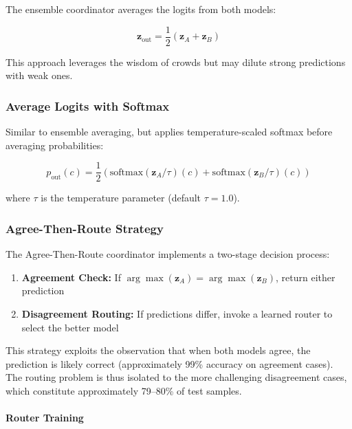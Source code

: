 The ensemble coordinator averages the logits from both models:

\begin{equation}
\mathbf{z}_{\text{out}} = \frac{1}{2}(\mathbf{z}_A + \mathbf{z}_B)
\end{equation}

This approach leverages the wisdom of crowds but may dilute strong predictions with weak ones.

\subsubsection{Average Logits with Softmax}

Similar to ensemble averaging, but applies temperature-scaled softmax before averaging probabilities:

\begin{equation}
p_{\text{out}}(c) = \frac{1}{2}\left(\text{softmax}(\mathbf{z}_A / \tau)(c) + \text{softmax}(\mathbf{z}_B / \tau)(c)\right)
\end{equation}

where $\tau$ is the temperature parameter (default $\tau=1.0$).

\subsubsection{Agree-Then-Route Strategy}

The Agree-Then-Route coordinator implements a two-stage decision process:

\begin{enumerate}
    \item \textbf{Agreement Check:} If $\arg\max(\mathbf{z}_A) = \arg\max(\mathbf{z}_B)$, return either prediction
    \item \textbf{Disagreement Routing:} If predictions differ, invoke a learned router to select the better model
\end{enumerate}

This strategy exploits the observation that when both models agree, the prediction is likely correct (approximately 99\% accuracy on agreement cases). The routing problem is thus isolated to the more challenging disagreement cases, which constitute approximately 79--80\% of test samples.

\paragraph{Router Training}

